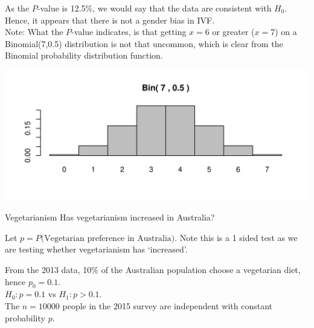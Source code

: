 \documentclass[t,xcolor=pdftex,dvipsnames,table]{beamer}
\makeatletter
\def\maxwidth{ %
  \ifdim\Gin@nat@width>\linewidth
    \linewidth
  \else
    \Gin@nat@width
  \fi
}
\newenvironment{knitrout}{}{} %
\makeatother
\begin{document}
\begin{frame}[fragile]{}

As the $P$-value is 12.5\%, we would say that the data are consistent with $H_{0}$. Hence, it appears that there is not a gender bias in IVF.\\

\vspace{.5cm}
Note: What the $P$-value indicates, is that getting $x=6$ or greater ($x=7$) on a Binomial(7,0.5) distribution is not that uncommon, which is clear from the Binomial probability distribution function.

\begin{knitrout}
\color{fgcolor}
\includegraphics[width=\maxwidth]{figure/unnamed-chunk-4-1} 

\end{knitrout}
\end{frame}


\begin{frame}{}

\begin{block}{Vegetarianism}
Has vegetarianism increased in Australia?
\end{block}

\vspace{.5cm}
Let $p = P(\mbox{Vegetarian preference in Australia)}$. Note this is a 1 sided test as we are testing whether vegetarianism has `increased'.

\vspace{.5cm}
From the 2013 data, 10\% of the Australian population choose a vegetarian diet, hence $p_{0} = 0.1$. \\
$H_{0}: p = 0.1$ vs $H_{1}: p > 0.1$. \\

\vspace{.5cm}
 The $n=10000$ people in the 2015 survey are independent with constant probability $p$.
\end{frame}
\end{document}
